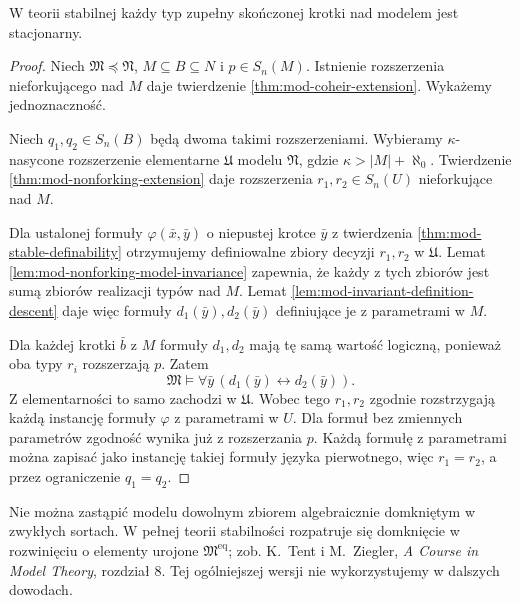 \begin{twierdzenie}
\label{thm:mod-stationary-model}
W teorii stabilnej każdy typ zupełny
skończonej krotki nad modelem jest stacjonarny.
\end{twierdzenie}
\begin{proof}
Niech $\mathfrak M\preccurlyeq\mathfrak N$,
$M\subseteq B\subseteq N$ i $p\in S_n(M)$.
Istnienie rozszerzenia nieforkującego nad $M$
daje twierdzenie \ref{thm:mod-coheir-extension}.
Wykażemy jednoznaczność.

Niech $q_1,q_2\in S_n(B)$ będą dwoma takimi
rozszerzeniami. Wybieramy $\kappa$-nasycone
rozszerzenie elementarne $\mathfrak U$
modelu $\mathfrak N$, gdzie
$\kappa>|M|+\aleph_0$. Twierdzenie
\ref{thm:mod-nonforking-extension}
daje rozszerzenia $r_1,r_2\in S_n(U)$
nieforkujące nad $M$.

Dla ustalonej formuły $\varphi(\bar x,\bar y)$
o niepustej krotce $\bar y$ z twierdzenia
\ref{thm:mod-stable-definability}
otrzymujemy definiowalne zbiory decyzji
$r_1,r_2$ w $\mathfrak U$.
Lemat \ref{lem:mod-nonforking-model-invariance}
zapewnia, że każdy z tych zbiorów jest
sumą zbiorów realizacji typów nad $M$.
Lemat \ref{lem:mod-invariant-definition-descent}
daje więc formuły $d_1(\bar y),d_2(\bar y)$
definiujące je z parametrami w $M$.

Dla każdej krotki $\bar b$ z $M$
formuły $d_1,d_2$ mają tę samą wartość
logiczną, ponieważ oba typy $r_i$
rozszerzają $p$. Zatem
\[
\mathfrak M\models
\forall\bar y\,(d_1(\bar y)\leftrightarrow d_2(\bar y)).
\]
Z elementarności to samo zachodzi
w $\mathfrak U$. Wobec tego $r_1,r_2$
zgodnie rozstrzygają każdą instancję
formuły $\varphi$ z parametrami w $U$.
Dla formuł bez zmiennych parametrów
zgodność wynika już z rozszerzania $p$.
Każdą formułę z parametrami można
zapisać jako instancję takiej formuły
języka pierwotnego, więc $r_1=r_2$,
a przez ograniczenie $q_1=q_2$.
\end{proof}

Nie można zastąpić modelu dowolnym zbiorem
algebraicznie domkniętym w zwykłych sortach.
W pełnej teorii stabilności rozpatruje się
domknięcie w rozwinięciu o elementy urojone
$\mathfrak M^{\mathrm{eq}}$; zob. K.~Tent
i M.~Ziegler, \emph{A Course in Model Theory},
rozdział 8. Tej ogólniejszej wersji nie
wykorzystujemy w dalszych dowodach.

